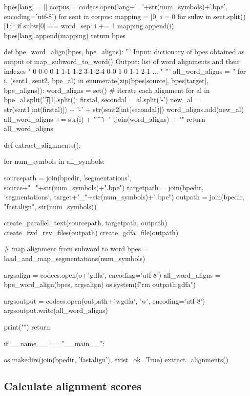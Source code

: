 \begin{python}
        bpes[lang] = []
        corpus = codecs.open(lang+'_'+str(num_symbols)+'.bpe', encoding='utf-8')
        for sent in corpus:
          mapping = [0]
          i = 0
          for subw in sent.split()[1:]:
              if subw[0] == word_sep:
                i += 1
              mapping.append(i)
          bpes[lang].append(mapping)
    return bpes


def bpe_word_align(bpes, bpe_aligns):
    '''
    Input: dictionary of bpes obtained as output of map_subword_to_word()
    Output: list of word alignments and their indexes
        "
            0   0-0 0-1 1-1 1-2 3-1 2-4    0-0 1-0 1-1 2-1 \n
            ...
        "
    '''
    all_word_aligns = ''
    for i, (sent1, sent2, bpe_al) in enumerate(zip(bpes[source], bpes[target], bpe_aligns)):
        word_aligns = set()
        # iterate each alignment
        for al in bpe_al.split('\t')[1].split():
            firstal, secondal = al.split('-')
            new_al = str(sent1[int(firstal)]) + '-' + str(sent2[int(secondal)])
            word_aligns.add(new_al)
        all_word_aligns += str(i) + "\t" + ' '.join(word_aligns) + "\n"
    return all_word_aligns


def extract_alignments():

  for num_symbols in all_symbols:

    sourcepath = join(bpedir, 'segmentations', source+"_"+str(num_symbols)+".bpe")
    targetpath = join(bpedir, 'segmentations', target+"_"+str(num_symbols)+".bpe")
    outpath = join(bpedir, "fastalign", str(num_symbols))

    create_parallel_text(sourcepath, targetpath, outpath)
    create_fwd_rev_files(outpath)
    create_gdfa_file(outpath)

    # map alignment from subword to word
    bpes = load_and_map_segmentations(num_symbols)

    argsalign = codecs.open(o+'.gdfa', encoding='utf-8')
    all_word_aligns = bpe_word_align(bpes, argsalign)
    os.system(f"rm {outpath}.gdfa")

    argsoutput = codecs.open(outpath+'.wgdfa', 'w', encoding='utf-8')
    argsoutput.write(all_word_aligns)

    print("\n\n")
  return

if __name__ == "__main__":

  os.makedirs(join(bpedir, 'fastalign'), exist_ok=True)
  extract_alignments()
\end{python}

\subsection{Calculate alignment scores}


